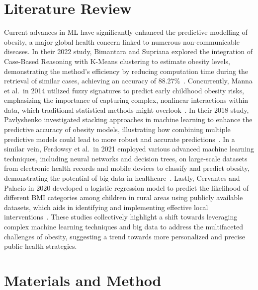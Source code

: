 \documentclass[12pt, a4paper]{article}
\begin{document}
\section{Literature Review}

Current advances in ML have significantly enhanced the predictive modelling of obesity,
a major global health concern linked to numerous non-communicable diseases. In their
2022 study, Bimantara and Supriana explored the integration of Case-Based Reasoning
with K-Means clustering to estimate obesity levels, demonstrating the method's
efficiency by reducing computation time during the retrieval of similar cases, achieving
an accuracy of 88.27\%~\cite{bimantara2022}. Concurrently, Manna et al.\ in 2014
utilized fuzzy signatures to predict early childhood obesity risks, emphasizing the
importance of capturing complex, nonlinear interactions within data, which traditional
statistical methods might overlook~\cite{manna2014}. In their 2018 study, Pavlyshenko
investigated stacking approaches in machine learning to enhance the predictive accuracy
of obesity models, illustrating how combining multiple predictive models could lead to
more robust and accurate predictions~\cite{pavlyshenko2018}. In a similar vein,
Ferdowsy et al.\ in 2021 employed various advanced machine learning techniques,
including neural networks and decision trees, on large-scale datasets from electronic
health records and mobile devices to classify and predict obesity, demonstrating the
potential of big data in healthcare~\cite{ferdowsy2021}. Lastly, Cervantes and Palacio
in 2020 developed a logistic regression model to predict the likelihood of different BMI
categories among children in rural areas using publicly available datasets, which aids
in identifying and implementing effective local interventions~\cite{cervantes2020}.
These studies collectively highlight a shift towards leveraging complex machine learning
techniques and big data to address the multifaceted challenges of obesity, suggesting a
trend towards more personalized and precise public health strategies.

\section{Materials and Method}
\end{document}
